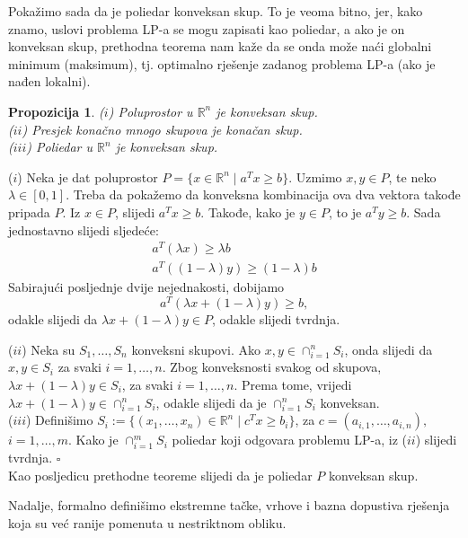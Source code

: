 \documentclass[a4paper, utf8, 11pt, colorlinks]{article}
\newtheorem{prop}{Propozicija}
\newenvironment{proof}{{Dokaz:}}{\hfill$\square$}
\begin{document}
Pokažimo sada da je poliedar konveksan skup. To je veoma bitno, jer, kako znamo, uslovi  problema LP-a se mogu zapisati kao poliedar, a ako je on konveksan skup, prethodna teorema nam kaže da se onda može naći globalni minimum (maksimum), tj. optimalno rješenje zadanog problema LP-a (ako je nađen lokalni).
\begin{prop}
  ($i$) Poluprostor u $\mathbb{R}^n$ je konveksan skup.  \\
  ($ii$) Presjek konačno mnogo skupova je konačan skup. \\
  ($iii$) Poliedar u $\mathbb{R}^n$ je konveksan skup. 
\end{prop}

\begin{proof}
  ($i$) Neka je dat poluprostor $P = \{ x \in \mathbb{R}^n \mid a^T x \geq b \}$. Uzmimo $x, y \in P$, te neko $\lambda \in [0, 1]$. Treba da pokažemo da konveksna kombinacija ova dva vektora takođe pripada $P$. Iz $x \in P$, slijedi  $a^T x \geq b$. Takođe, kako je $y \in P$, to je  $a^T y \geq b$. 
  Sada jednostavno slijedi sljedeće:
  \begin{align}
      a^T (\lambda x) \geq \lambda b \\
      a^T ((1-\lambda) y) \geq (1-\lambda) b 
  \end{align}
  Sabirajući posljednje dvije nejednakosti, dobijamo 
  \begin{equation}
      a^T( \lambda x + (1 - \lambda) y ) \geq b,
  \end{equation}
  odakle slijedi da $\lambda x + (1-\lambda) y \in P$, odakle slijedi tvrdnja. 
  
  ($ii$) Neka su $S_1,\ldots, S_n$ konveksni skupovi. Ako $x,y \in \cap_{i=1}^n S_i$, onda slijedi da $x,y \in S_i$ za svaki $i=1,\ldots,n$. Zbog konveksnosti svakog od skupova,  
  $\lambda x + (1 - \lambda) y \in S_i$, za svaki $i=1,\ldots,n$. Prema tome, vrijedi $ \lambda x + (1-\lambda) y \in \cap_{i=1}^n S_i$, odakle slijedi da je $\cap_{i=1}^n S_i$ konveksan. \\
  
  ($iii$) Definišimo $S_i:= \{ (x_1,\ldots, x_n) \in \mathbb{R}^n \mid c^T x \geq b_i \}$, za  $c = (a_{i,1}, \ldots, a_{i, n}),$  $ i=1,\ldots, m$. Kako je $\cap_{i=1}^m S_i$ poliedar koji odgovara problemu LP-a, iz ($ii$) slijedi tvrdnja. 
\end{proof}\\
Kao posljedicu prethodne teoreme slijedi da je poliedar $P$ konveksan skup. 


Nadalje, formalno definišimo ekstremne tačke, vrhove i bazna dopustiva rješenja koja su već ranije pomenuta u nestriktnom obliku. 
\end{document}
